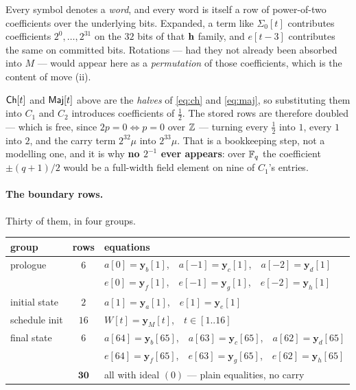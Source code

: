 Every symbol denotes a \emph{word}, and every word is itself a row of
power-of-two coefficients over the underlying bits. Expanded, a term like
$\Sigma_0[t]$ contributes coefficients $2^0,\dots,2^{31}$ on the $32$ bits of
that $\mathbf{h}$ family, and $e[t{-}3]$ contributes the same on committed bits.
Rotations --- had they not already been absorbed into $M$ --- would appear here as
a \emph{permutation} of those coefficients, which is the content of move (ii).

\begin{remark}\label{rem:doubling}
$\mathsf{Ch}[t]$ and $\mathsf{Maj}[t]$ above are the \emph{halves} of \eqref{eq:ch} and
\eqref{eq:maj}, so substituting them into $C_1$ and $C_2$ introduces
coefficients of $\tfrac12$. The stored rows are therefore doubled --- which is
free, since $2p=0 \iff p=0$ over $\mathbb{Z}$ --- turning every $\tfrac12$ into $1$,
every $1$ into $2$, and the carry term $2^{32}\mu$ into $2^{33}\mu$. That is a
bookkeeping step, not a modelling one, and it is why \textbf{no $2^{-1}$ ever
appears}: over $\mathbb{F}_q$ the coefficient $\pm(q{+}1)/2$ would be a full-width field
element on nine of $C_1$'s entries.
\end{remark}

\paragraph{The boundary rows.} Thirty of them, in four groups.

\begin{center}\small
\begin{tabular}{@{}lcl@{}}
\toprule
group & rows & equations\\
\midrule
prologue & $6$ & $a[0]=\mathbf y_b[1]$,\ \ $a[{-}1]=\mathbf y_c[1]$,\ \
  $a[{-}2]=\mathbf y_d[1]$\\
 & & $e[0]=\mathbf y_f[1]$,\ \ $e[{-}1]=\mathbf y_g[1]$,\ \
  $e[{-}2]=\mathbf y_h[1]$\\[3pt]
initial state & $2$ & $a[1]=\mathbf y_a[1]$,\ \ $e[1]=\mathbf y_e[1]$\\[3pt]
schedule init & $16$ & $W[t]=\mathbf y_M[t]$,\ \ $t\in[1..16]$\\[3pt]
final state & $6$ & $a[64]=\mathbf y_b[65]$,\ \ $a[63]=\mathbf y_c[65]$,\ \
  $a[62]=\mathbf y_d[65]$\\
 & & $e[64]=\mathbf y_f[65]$,\ \ $e[63]=\mathbf y_g[65]$,\ \
  $e[62]=\mathbf y_h[65]$\\
\midrule
 & $\mathbf{30}$ & all with ideal $(0)$ --- plain equalities, no carry\\
\bottomrule
\end{tabular}
\end{center}

